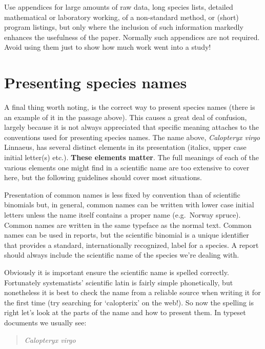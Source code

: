 \documentclass[
]{book}
\begin{document}
Use appendices for large amounts of raw data, long species lists, detailed mathematical or laboratory working, of a non-standard method, or (short) program listings, but only where the inclusion of such information markedly enhances the usefulness of the paper. Normally such appendices are not required. Avoid using them just to show how much work went into a study!

\hypertarget{presenting-species-names}{%
\section{Presenting species names}\label{presenting-species-names}}

A final thing worth noting, is the correct way to present species names (there is an example of it in the passage above). This causes a great deal of confusion, largely because it is not always appreciated that specific meaning attaches to the conventions used for presenting species names. The name above, \emph{Calopteryx virgo} Linnaeus, has several distinct elements in its presentation (italics, upper case initial letter(s) etc.). \textbf{These elements matter}. The full meanings of each of the various elements one might find in a scientific name are too extensive to cover here, but the following guidelines should cover most situations.

Presentation of common names is less fixed by convention than of scientific binomials but, in general, common names can be written with lower case initial letters unless the name itself contains a proper name (e.g.~Norway spruce). Common names are written in the same typeface as the normal text. Common names can be used in reports, but the scientific binomial is a unique identifier that provides a standard, internationally recognized, label for a species. A report should always include the scientific name of the species we're dealing with.

Obviously it is important ensure the scientific name is spelled correctly. Fortunately systematists' scientific latin is fairly simple phonetically, but nonetheless it is best to check the name from a reliable source when writing it for the first time (try searching for `calopterix' on the web!). So now the spelling is right let's look at the parts of the name and how to present them. In typeset documents we usually see:

\begin{quote}
\emph{Calopteryx virgo}
\end{quote}
\end{document}
